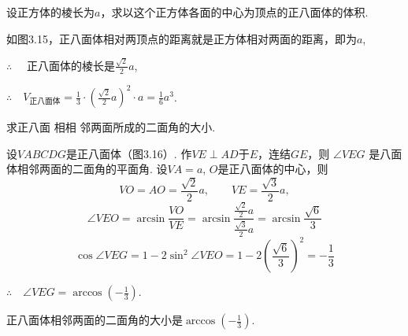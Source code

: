 \begin{example}
    设正方体的棱长为$a$，求以这个正方体各面的中心为顶点的正八面体的体积.
\end{example}



\begin{solution}
如图3.15，正八面体相对两顶点的距离就是正方体相对两面的距离，即为$a$, 

$\therefore\quad$ 正八面体的棱长是$\frac{\sqrt{2}}{2}a$,

$\therefore\quad V_{\text{正八面体}}=\frac{1}{3}\cdot \left(\frac{\sqrt{2}}{2}a\right)^{2}\cdot  a=\frac{1}{6}a^{3}$.
\end{solution}

\begin{example}
    求正八面 相相 邻两面所成的二面角的大小.
\end{example}

\begin{figure}[htp]
    \centering
{}
    \caption{}
\end{figure}


\begin{solution}
    设$VABCDG$是正八面体（图3.16）. 作$VE\perp AD$于$E$，连结$GE$，则 $\angle VEG$ 是八面体相邻两面的二面角的平面角. 设$VA=a$,  $O$是正八面体的中心，则
\[
VO=AO=\frac{\sqrt{2}}{2}a,\qquad VE=\frac{\sqrt{3}}{2}a,\]
\[
\angle VEO=\arcsin\frac{VO}{VE}=\arcsin\frac{\frac{\sqrt{2}}{2}a}{\frac{\sqrt{3}}{2}a}=\arcsin\frac{\sqrt{6}}{3}\]
\[
\cos\angle VEG=1-2\sin^{2}\angle VEO=1-2\left(\frac{\sqrt{6}}{3}\right)^{2}=-\frac{1}{3}\]

$\therefore\quad \angle VEG=\arccos\left(-\frac{1}{3}\right)$.

正八面体相邻两面的二面角的大小是$\arccos\left(-\frac{1}{3}\right)$.
\end{solution}



